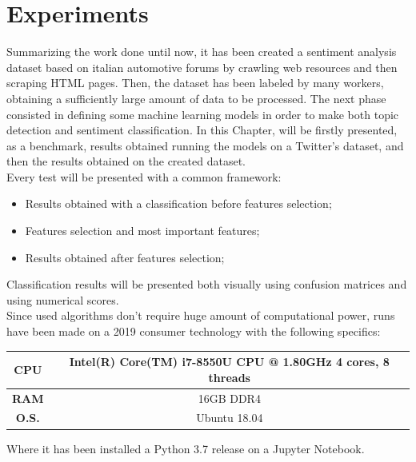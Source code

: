 
\chapter{Experiments}

Summarizing the work done until now, it has been created a sentiment analysis dataset based on italian automotive forums by crawling web resources and then scraping HTML pages. Then, the dataset has been labeled by many workers, obtaining a sufficiently large amount of data to be processed. The next phase consisted in defining some machine learning models in order to make both topic detection and sentiment classification. In this Chapter, will be firstly presented, as a benchmark, results obtained running the models on a Twitter's dataset, and then the results obtained on the created dataset.\\
Every test will be presented with a common framework: 
\begin{itemize}
	\item Results obtained with a classification before features selection;
	\item Features selection and most important features;
	\item Results obtained after features selection;
\end{itemize}
Classification results will be presented both visually using confusion matrices and using numerical scores.\\
Since used algorithms don't require huge amount of computational power, runs have been made on a 2019 consumer technology with the following specifics:
\begin{center}
	\begin{tabular}{ |c||c| } 
		\hline
		\textbf{CPU} & Intel(R) Core(TM) i7-8550U CPU @ 1.80GHz 4 cores, 8 threads\\ 
		\hline
		\textbf{RAM} & 16GB DDR4 \\
		\hline
		\textbf{O.S.} & Ubuntu 18.04 \\
		\hline
	\end{tabular}
\end{center}
Where it has been installed a Python 3.7 release on a Jupyter Notebook.


